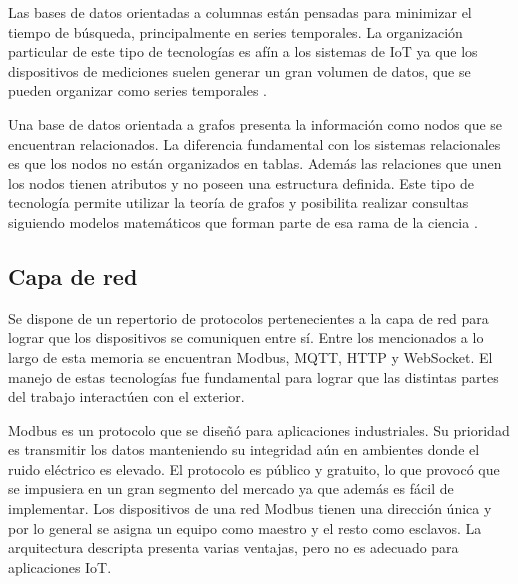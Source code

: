 Las bases de datos orientadas a columnas están pensadas para minimizar el tiempo de búsqueda, principalmente en series temporales.
La organización particular de este tipo de tecnologías es afín a los sistemas de IoT ya que los dispositivos de mediciones suelen generar un gran volumen de datos, que se pueden organizar como series temporales \citep{abadi2009column}.

Una base de datos orientada a grafos presenta la información como nodos que se encuentran relacionados.
La diferencia fundamental con los sistemas relacionales es que los nodos no están organizados en tablas.
Además las relaciones que unen los nodos tienen atributos y no poseen una estructura definida.
Este tipo de tecnología permite utilizar la teoría de grafos y posibilita realizar consultas siguiendo modelos matemáticos que forman parte de esa rama de la ciencia \citep{gyssens1994graph}.


\newpage

\subsection{Capa de red}
Se dispone de un repertorio de protocolos pertenecientes a la capa de red para lograr que los dispositivos se comuniquen entre sí.
Entre los mencionados a lo largo de esta memoria se encuentran Modbus, MQTT, HTTP y WebSocket. El manejo de estas tecnologías fue fundamental para lograr que las distintas partes del trabajo interactúen con el exterior.

Modbus es un protocolo que se diseñó para aplicaciones industriales.
Su prioridad es transmitir los datos manteniendo su integridad aún en ambientes donde el ruido eléctrico es elevado. El protocolo es público y gratuito, lo que provocó que se impusiera en un gran segmento del mercado ya que además es fácil de implementar.
Los dispositivos de una red Modbus tienen una dirección única y por lo general se asigna un equipo como maestro y el resto como esclavos. La arquitectura descripta presenta varias ventajas, pero no es adecuado para aplicaciones IoT.


